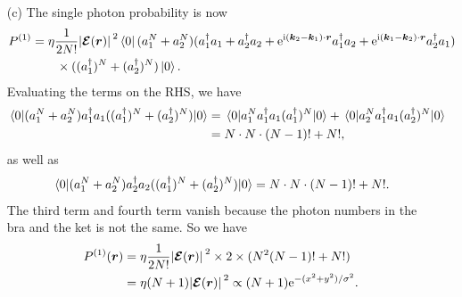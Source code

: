\documentclass[hyperref, a4paper]{article}
\newcommand*{\ii}{\mathrm{i}}
\newcommand*{\ee}{\mathrm{e}}
\begin{document}
\begin{itemize}
\item[(c)] The single photon probability is now 
\[
    \begin{aligned}
        P^{(1)} &= \eta \frac{1}{2 N!} \abs*{\vb*{\mathcal{E}} (\vb*{r})}^2 \bra*{0} (a_1^N + a_2^N) (a_1^\dagger a_1 + a_2^\dagger a_2 + \ee^{\ii (\vb*{k}_2 - \vb*{k}_1) \cdot \vb*{r}} a_1^\dagger a_2 + \ee^{\ii (\vb*{k}_1 - \vb*{k}_2) \cdot \vb*{r}} a_2^\dagger a_1 ) \\
        &\quad \quad \times ((a_1^\dagger)^N + (a_2^\dagger)^N) \ket*{0}.
    \end{aligned}
\] 
Evaluating the terms on the RHS, we have 
\[
    \begin{aligned}
        \expval*{(a_1^N + a_2^N) a_1^\dagger a_1 ((a_1^\dagger)^N + (a_2^\dagger)^N)}{0}
        &= \expval*{a_1^N a_1^\dagger a_1 (a_1^\dagger)^N }{0} + \expval*{a_2^N a_1^\dagger a_1 (a_2^\dagger)^N }{0} \\
        &= N \cdot N \cdot (N-1)! + N!,
    \end{aligned}
\]
as well as 
\[
    \expval*{(a_1^N + a_2^N) a_2^\dagger a_2 ((a_1^\dagger)^N + (a_2^\dagger)^N)}{0} = N \cdot N \cdot (N-1)! + N!.
\]
The third term and fourth term vanish because the photon numbers in the bra and the ket is not the same.
So we have 
\begin{equation}
    \begin{aligned}
        P^{(1)}(\vb*{r}) &= \eta \frac{1}{2 N!} \abs*{\vb*{\mathcal{E}}(\vb*{r})}^2 \times 2 \times (N^2 (N-1)! + N!) \\
        &= \eta (N+1) \abs*{\vb*{\mathcal{E}}(\vb*{r})}^2  \propto (N+1) \ee^{- (x^2 + y^2) / \sigma^2}.
    \end{aligned}
\end{equation}


\end{itemize}
\end{document}
